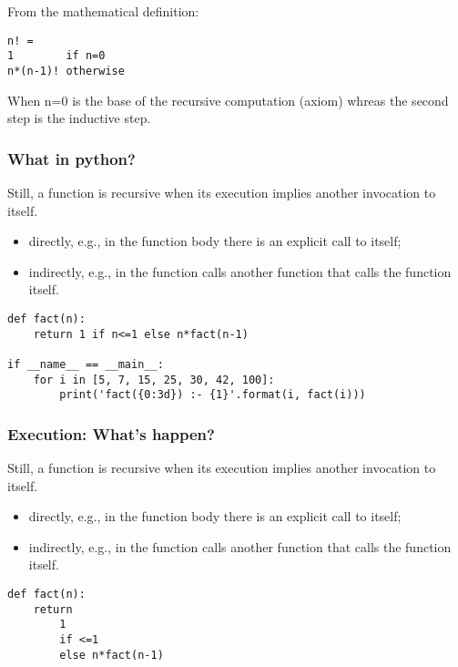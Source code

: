 From the mathematical definition:
\begin{lstlisting}
n! = 
1        if n=0
n*(n-1)! otherwise
\end{lstlisting}

When n=0 is the base of the recursive computation (axiom) whreas the second step is the inductive step.

\subsubsection{What in python?}
Still, a function is recursive when its execution implies another invocation to itself.
\begin{itemize}
	\item directly, e.g., in the function body there is an explicit call to itself;
	\item indirectly, e.g., in the function calls another function that calls the function itself.
\end{itemize}

\begin{lstlisting}
def fact(n):
	return 1 if n<=1 else n*fact(n-1)
	
if __name__ == __main__:
	for i in [5, 7, 15, 25, 30, 42, 100]:
		print('fact({0:3d}) :- {1}'.format(i, fact(i)))
\end{lstlisting}

\subsubsection{Execution: What's happen?}
Still, a function is recursive when its execution implies another invocation to itself.
\begin{itemize}
	\item directly, e.g., in the function body there is an explicit call to itself;
	\item indirectly, e.g., in the function calls another function that calls the function itself.
\end{itemize}

\begin{lstlisting}
def fact(n):
	return
		1
		if <=1
		else n*fact(n-1)
\end{lstlisting}

